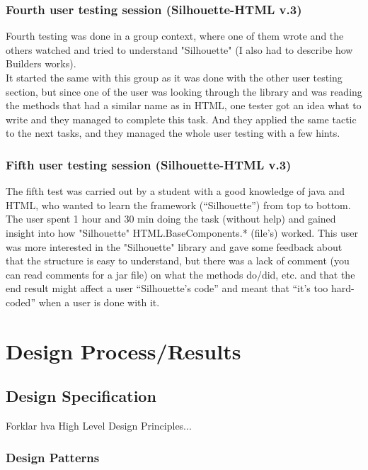 \documentclass[12pt]{article}
\begin{document}
        \subsubsection{Fourth user testing session (Silhouette-HTML v.3)}
        Fourth testing was done in a group context, where one of them wrote and the others watched and tried to understand "Silhouette" (I also had to describe how Builders works). \\
        It started the same with this group as it was done with the other user testing section, but since one of the user was looking through the library and was reading the methods that had a similar name as in HTML, one tester got an idea what to write and they managed to complete this task. And they applied the same tactic to the next tasks, and they managed the whole user testing with a few hints. 

        \subsubsection{Fifth user testing session (Silhouette-HTML v.3)}
        The fifth test was carried out by a student with a good knowledge of java and HTML, who wanted to learn the framework (“Silhouette”) from top to bottom. The user spent 1 hour and 30 min doing the task (without help) and gained insight into how "Silhouette" HTML.BaseComponents.* (file's) worked. This user was more interested in the "Silhouette" library and gave some feedback about that the structure is easy to understand, but there was a lack of comment (you can read comments for a jar file) on what the methods do/did, etc. and that the end result might affect a user “Silhouette’s code” and meant that “it’s too hard-coded” when a user is done with it.


\section{Design Process/Results}

    \subsection{Design Specification}
    Forklar hva High Level Design Principles...

        \subsubsection{Design Patterns}
\end{document}
